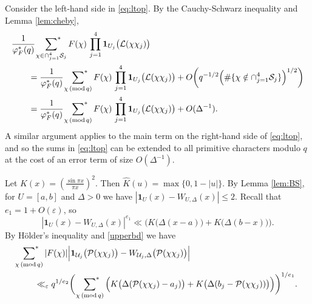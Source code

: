 \documentclass[12pt, reqno]{amsart}
\renewcommand{\pmod}[1]{\,(\mathrm{mod}\,#1)}
\newcommand{\acom}[1]{{\color{blue}{Alexandra: #1}} }
\numberwithin{equation}{section}
\numberwithin{theorem}{section}
\numberwithin{equation}{section}
\def\sumstar{\sideset{}{^*}\sum}
\begin{document}
Consider the left-hand side in \eqref{eq:ltop}. By the Cauchy-Schwarz inequality and Lemma \ref{lem:cheby}, 
\begin{align*}
&\frac{1}{\varphi_F^{*}(q)}\ \sumstar_{\chi \in \cap_{j=1}^{4} \mathcal S_j} F(\chi) \, \prod_{j=1}^{4}\mathbf{1}_{U_j}\big(\mathcal L(\chi\chi_j)\big)\\
&\qquad=\frac{1}{\varphi_F^{*}(q)}\ \sumstar_{\chi \pmod q} F(\chi) \, \prod_{j=1}^{4}\mathbf{1}_{U_j}\big(\mathcal L(\chi\chi_j)\big) +O\bigg(q^{-1/2} \Big(\#\{\chi \notin \cap_{j=1}^{4} \mathcal S_j\}\Big)^{1/2} \bigg)\\
&\qquad=\frac{1}{\varphi_F^{*}(q)}\ \sumstar_{\chi \pmod q} F(\chi) \, \prod_{j=1}^{4}\mathbf{1}_{U_j}\big(\mathcal L(\chi\chi_j)\big)+O(\Delta^{-1}).
\end{align*}
A similar argument applies to the main term on the right-hand side of \eqref{eq:ltop}, and so the sums in \eqref{eq:ltop} can be extended to all primitive characters modulo $q$ at the cost of an error term of size $O(\Delta^{-1})$.

Let $K(x)=(\frac{\sin \pi x}{\pi x} )^2$. Then $\widehat K(u)=\max\{0,1-|u|\}$. 
By Lemma \ref{lem:BS},  for $U=[a,b]$ and $\Delta>0$ we have $|\mathbf{1}_U(x)-W_{U,\Delta}(x)| \le 2$. Recall that $e_1=1+O(\varepsilon)$, so $$|\mathbf{1}_U(x)-W_{U,\Delta}(x)|^{e_1} \ll \Big( K\big(\Delta(x-a)\big)+K\big(\Delta(b-x)\big)\Big).$$ %
By H\"older's inequality and \eqref{upperbd} we have
\begin{align}\label{eq:smoothtosharp}
&\sumstar_{\chi \pmod q} |F(\chi)| \Big|\mathbf{1}_{\mathcal U_j}\big(\mathcal P(\chi\chi_j)\big)-W_{\mathcal U_j,\Delta}\big(\mathcal P(\chi\chi_j)\big)\Big|\nonumber\\
&\qquad \ll_\varepsilon q^{1/e_2}  \bigg(\,\, \sumstar_{\chi \pmod q} \Big( K\big(\Delta(\mathcal P(\chi\chi_j)-a_j)\big)+K\big(\Delta(b_j-\mathcal P(\chi\chi_j))\big)\Big)  \bigg)^{1/e_1}.
\end{align}
\end{document}
